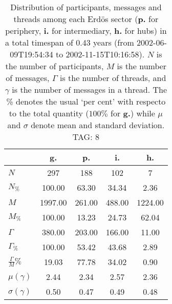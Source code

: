 \begin{table}[h!]
\begin{center}
\begin{tabular}{| l || c | c | c | c |}\hline
 & {\bf g.} & {\bf p.} & {\bf i.} & {\bf h.} \\\hline\hline
$N$ & 297  & 188  & 102  & 7 \\
$N_{\%}$ & 100.00  & 63.30  & 34.34  & 2.36 \\\hline
$M$ & 1997.00  & 261.00  & 488.00  & 1224.00 \\
$M_{\%}$ & 100.00  & 13.23  & 24.73  & 62.04 \\\hline
$\Gamma$ & 380.00  & 203.00  & 166.00  & 11.00 \\
$\Gamma_{\%}$ & 100.00  & 53.42  & 43.68  & 2.89 \\\hline
$\frac{\Gamma}{M}\%$ & 19.03  & 77.78  & 34.02  & 0.90 \\
$\mu(\gamma)$ & 2.44  & 2.34  & 2.57  & 2.36 \\
$\sigma(\gamma)$ & 0.50  & 0.47  & 0.49  & 0.48 \\\hline
\end{tabular}
\caption{Distribution of participants, messages and threads among each Erd\"os sector ({\bf p.} for periphery, {\bf i.} for intermediary, 
    {\bf h.} for hubs) in a total timespan of 0.43 years (from 2002-06-09T19:54:34 to 2002-11-15T10:16:58). $N$ is the number of participants, $M$ is the number of messages, $\Gamma$ is the number of threads, and $\gamma$ is the number of messages in a thread.
    The \% denotes the usual `per cent' with respecto to the total quantity ($100\%$ for {\bf g.})
    while $\mu$ and $\sigma$ denote mean and standard deviation. TAG: 8}
\end{center}
\end{table}
